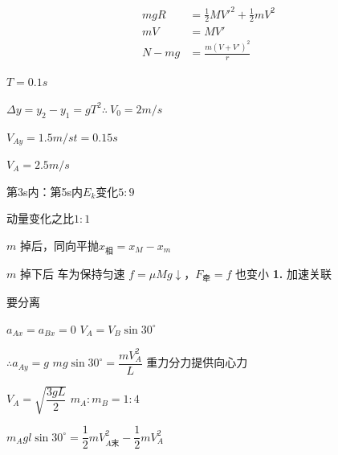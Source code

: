 \begin{align*}
mgR&=\frac12MV'^2+\frac12mV^2\\
mV&=MV'\\
N-mg&=\frac{m(V+V')^2}{r}
\end{align*}
\begin{problem}
$T=0.1\unit{s}$
\begin{solution}
$\Delta y=y_2-y_1=gT^2$\quad $\therefore\ V_0=2\unit{m/s}$

$V_{Ay}=1.5\unit{m/s}$\quad $t=0.15\unit{s}$

$V_A=2.5\unit{m/s}$
\end{solution}
\end{problem}
\begin{problem}
\begin{solution}
第3s内：第5s内\quad $E_k$变化\quad $5:9$ %

动量变化之比\quad $1:1$
\end{solution}
\end{problem}

$m$ 掉后，同向平抛$x_{\text{相}}=x_M-x_m$

$m$ 掉下后 车为保持匀速 $f=\mu Mg\downarrow$，$F_{\text{牵}}=f$ 也变小
\textbf{1.} 加速关联

要分离

$a_{Ax}=a_{Bx}=0$ \qquad $V_A=V_B\sin30^\circ$ %

$\therefore a_{Ay}=g$ \qquad $mg\sin30^\circ=\dfrac{mV_A^{2}}{L}$ 重力分力提供向心力

$V_A=\sqrt{\dfrac{3gL}{2}}$ \qquad $m_A:m_B=1:4$ %

$m_Agl\sin30^\circ=\dfrac12 mV_{A\text{末}}^{2}-\dfrac12 mV_A^{2}$ %

